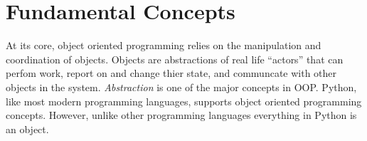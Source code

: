 \section*{Fundamental Concepts}

\begin{comment}
At its core, object oriented programming relies on the manipulation and coordination of objects.
An object represents a piece of code that tracks a state and provides methods for discovering or altering the state.


There are a few concepts that define object oriented programming

\begin{itemize}

\item Abstraction - appropriate representation of states and data

\item Encapsulation - independent behavior

\item Inheritance - relations between objects

\end{itemize}

The general advantage of using these concepts is that it helps with organizing code.
``Abstraction" permits the presentation of only necessary details about an object to the user.
For example, when we ask someone if they own a computer, we can use abstraction to ask the question ``Do you own a computer?'' rather than asking about each and every combination of hardware that we could classify as a computer.
Inheritance helps us easily achieve this abstraction.
We could have an object called \li{Computer}.
Various brands would then subclass, or inherit, the properties of \li{Computer}.
We could continue by having each product line inherit from their respective brands, until we arrive at the product level.
Then each individual product would represent an instantiation of that product's class.
Encapsulation means each function contains all of the data it needs to calculate a result.
Encapsulation is used to avoid the use of global data structures and makes managing data involved in computation more convenient.
\end{comment}

At its core, object oriented programming relies on the manipulation and coordination of objects.
Objects are abstractions of real life ``actors'' that can perfom work, report on and change thier state, and communcate with other objects in the system. %
\emph{Abstraction} is one of the major concepts in OOP.
Python, like most modern programming languages, supports object oriented programming concepts.
However, unlike other programming languages everything in Python is an object.

